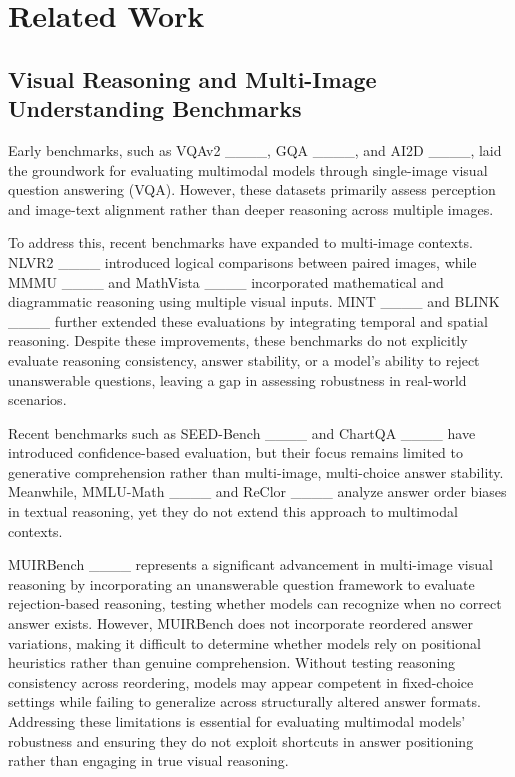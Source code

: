 \section{Related Work}
\label{sec:related_work}



\subsection{Visual Reasoning and Multi-Image Understanding Benchmarks}
Early benchmarks, such as VQAv2 ____, GQA ____, and AI2D ____, laid the groundwork for evaluating multimodal models through single-image visual question answering (VQA). However, these datasets primarily assess perception and image-text alignment rather than deeper reasoning across multiple images.

To address this, recent benchmarks have expanded to multi-image contexts. NLVR2 ____ introduced logical comparisons between paired images, while MMMU ____ and MathVista ____ incorporated mathematical and diagrammatic reasoning using multiple visual inputs. MINT ____ and BLINK ____ further extended these evaluations by integrating temporal and spatial reasoning. Despite these improvements, these benchmarks do not explicitly evaluate reasoning consistency, answer stability, or a model’s ability to reject unanswerable questions, leaving a gap in assessing robustness in real-world scenarios.

Recent benchmarks such as SEED-Bench ____ and ChartQA ____ have introduced confidence-based evaluation, but their focus remains limited to generative comprehension rather than multi-image, multi-choice answer stability. Meanwhile, MMLU-Math ____ and ReClor ____ analyze answer order biases in textual reasoning, yet they do not extend this approach to multimodal contexts.

MUIRBench ____ represents a significant advancement in multi-image visual reasoning by incorporating an unanswerable question framework to evaluate rejection-based reasoning, testing whether models can recognize when no correct answer exists. However, MUIRBench does not incorporate reordered answer variations, making it difficult to determine whether models rely on positional heuristics rather than genuine comprehension. Without testing reasoning consistency across reordering, models may appear competent in fixed-choice settings while failing to generalize across structurally altered answer formats. Addressing these limitations is essential for evaluating multimodal models’ robustness and ensuring they do not exploit shortcuts in answer positioning rather than engaging in true visual reasoning.



